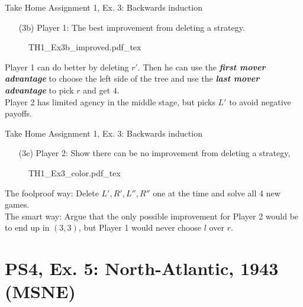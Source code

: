 \begin{frame}{Take Home Assignment 1, Ex. 3: Backwards induction}
  \begin{itemize}
    \item[(3b)] Player 1: The best improvement from deleting a strategy.
  \end{itemize}
  \begin{figure}[!h]
    \begin{center}
    \def\svgwidth{\columnwidth}
    {TH1_Ex3b_improved.pdf_tex}
    \end{center}
  \end{figure}
  Player 1 can do better by deleting $r'$. Then he can use the \textit{\textbf{first mover advantage}} to choose the left side of the tree and use the \textit{\textbf{last mover advantage}} to pick $r$ and get $4$.\\\medskip
  Player 2 has limited agency in the middle stage, but picks $L'$ to avoid negative payoffs.
\end{frame}
\begin{frame}{Take Home Assignment 1, Ex. 3: Backwards induction}
  \begin{itemize}
    \item[(3c)] Player 2: Show there can be no improvement from deleting a strategy,
  \end{itemize}
  \begin{figure}[!h]
    \begin{center}
    \def\svgwidth{\columnwidth}
    {TH1_Ex3_color.pdf_tex}
    \end{center}
  \end{figure}
  The foolproof way: Delete $L',R',L'',R''$ one at the time and solve all 4 new games.\\\medskip
  The smart way: Argue that the only possible improvement for Player 2 would be to end up in $(3,3)$, but Player 1 would never choose $l$ over $r$.
\end{frame}


\section{PS4, Ex. 5: North-Atlantic, 1943 (MSNE)}

